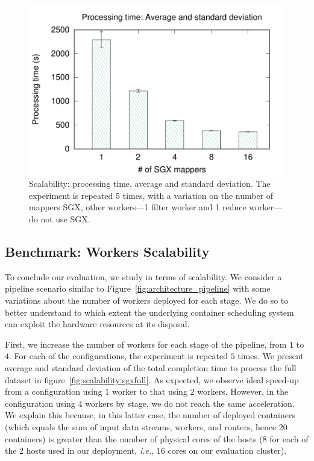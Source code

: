 \begin{figure}[t!]
  \centering  \includegraphics[width=\linewidth]{plots/secure_streams/scalability/sgxmapper_scalability}
  \caption{Scalability: processing time, average and standard deviation. The experiment is repeated 5 times, with a variation on the number of mappers SGX, other workers---1 filter worker and 1 reduce worker---do not use SGX.}
  \label{fig:scalability:sgxmapper}
\end{figure}

\subsection{Benchmark: Workers Scalability}
To conclude our evaluation, we study \SYS{} in terms of scalability.
We consider a pipeline scenario similar to Figure~\ref{fig:architecture_pipeline} with some variations about the number of workers deployed for each stage.
We do so to better understand to which extent the underlying container scheduling system can exploit the hardware resources at its disposal.

First, we increase the number of workers for each stage of the pipeline, from $1$ to $4$.
For each of the configurations, the experiment is repeated $5$ times.
We present average and standard deviation of the total completion time to process the full dataset in figure~\ref{fig:scalability:sgxfull}.
As expected, we observe ideal speed-up from a configuration using $1$ worker to that using $2$ workers.
However, in the configuration using $4$ workers by stage, we do not reach the same acceleration.
We explain this because, in this latter case, the number of deployed containers (which equals the sum of input data streams, workers, and routers, hence $20$ containers) is greater than the number of physical cores of the hosts ($8$ for each of the $2$ hosts used in our deployment, \emph{i.e.}, $16$ cores on our evaluation cluster).

